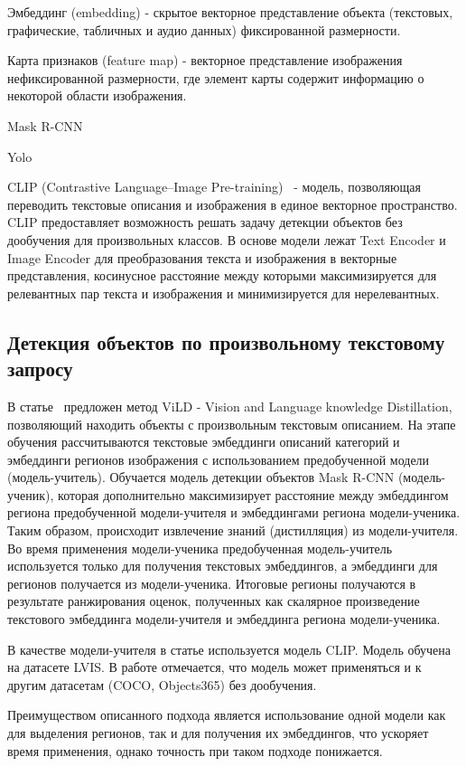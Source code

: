 \documentclass[a4paper,14pt]{article}
\begin{document}
	Эмбеддинг (embedding) - скрытое векторное представление объекта (текстовых, графические, табличных и аудио данных) фиксированной размерности.
	
	Карта признаков (feature map) - векторное представление изображения нефиксированной размерности, где элемент карты содержит информацию о некоторой области изображения.
	
	Mask R-CNN
	
	Yolo
	
	CLIP (Contrastive Language–Image Pre-training)~\cite{CLIP} - модель, позволяющая переводить текстовые описания и изображения в единое векторное пространство. 
	CLIP предоставляет возможность решать задачу детекции объектов без дообучения для произвольных классов.
	В основе модели лежат Text Encoder и Image Encoder для преобразования текста и изображения в векторные представления, косинусное расстояние между которыми максимизируется для релевантных пар текста и изображения и минимизируется для нерелевантных.
	
	\subsection{Детекция объектов по произвольному текстовому запросу}
	
	В статье~\cite{ViLD} предложен метод ViLD - Vision and Language knowledge Distillation, позволяющий находить объекты с произвольным текстовым описанием. 
	На этапе обучения рассчитываются текстовые эмбеддинги описаний категорий и эмбеддинги регионов изображения с использованием предобученной модели (модель-учитель). 
	Обучается модель детекции объектов Mask R-CNN (модель-ученик), которая дополнительно максимизирует расстояние между эмбеддингом региона предобученной модели-учителя и эмбеддингами региона модели-ученика. 
	Таким образом, происходит извлечение знаний (дистилляция) из модели-учителя. 
	Во время применения модели-ученика предобученная модель-учитель используется только для получения текстовых эмбеддингов, а эмбеддинги для регионов получается из модели-ученика. 
	Итоговые регионы получаются в результате ранжирования оценок, полученных как скалярное произведение текстового эмбеддинга модели-учителя и эмбеддинга региона модели-ученика.
	 
	В качестве модели-учителя в статье используется модель CLIP. 
	Модель обучена на датасете LVIS. В работе отмечается, что модель может применяться и к другим датасетам (COCO, Objects365) без дообучения.
	
	Преимуществом описанного подхода является использование одной модели как для выделения регионов, так и для получения их эмбеддингов, что ускоряет время применения, однако точность при таком подходе понижается.
	
\end{document}
